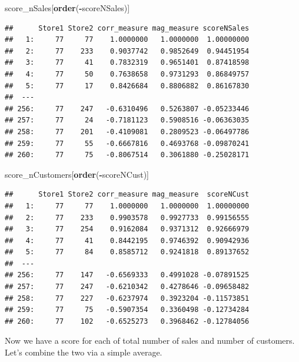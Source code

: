 \documentclass[
]{article}
\newenvironment{Shaded}{\begin{snugshade}}{\end{snugshade}}
\newcommand{\KeywordTok}[1]{\textcolor[rgb]{0.13,0.29,0.53}{\textbf{#1}}}
\newcommand{\NormalTok}[1]{#1}
\newcommand{\OperatorTok}[1]{\textcolor[rgb]{0.81,0.36,0.00}{\textbf{#1}}}
\begin{document}
\begin{Shaded}
\begin{Highlighting}[]
\NormalTok{score_nSales[}\KeywordTok{order}\NormalTok{(}\OperatorTok{-}\NormalTok{scoreNSales)]}
\end{Highlighting}
\end{Shaded}

\begin{verbatim}
##      Store1 Store2 corr_measure mag_measure scoreNSales
##   1:     77     77    1.0000000   1.0000000  1.00000000
##   2:     77    233    0.9037742   0.9852649  0.94451954
##   3:     77     41    0.7832319   0.9651401  0.87418598
##   4:     77     50    0.7638658   0.9731293  0.86849757
##   5:     77     17    0.8426684   0.8806882  0.86167830
##  ---                                                   
## 256:     77    247   -0.6310496   0.5263807 -0.05233446
## 257:     77     24   -0.7181123   0.5908516 -0.06363035
## 258:     77    201   -0.4109081   0.2809523 -0.06497786
## 259:     77     55   -0.6667816   0.4693768 -0.09870241
## 260:     77     75   -0.8067514   0.3061880 -0.25028171
\end{verbatim}

\begin{Shaded}
\begin{Highlighting}[]
\NormalTok{score_nCustomers[}\KeywordTok{order}\NormalTok{(}\OperatorTok{-}\NormalTok{scoreNCust)]}
\end{Highlighting}
\end{Shaded}

\begin{verbatim}
##      Store1 Store2 corr_measure mag_measure  scoreNCust
##   1:     77     77    1.0000000   1.0000000  1.00000000
##   2:     77    233    0.9903578   0.9927733  0.99156555
##   3:     77    254    0.9162084   0.9371312  0.92666979
##   4:     77     41    0.8442195   0.9746392  0.90942936
##   5:     77     84    0.8585712   0.9241818  0.89137652
##  ---                                                   
## 256:     77    147   -0.6569333   0.4991028 -0.07891525
## 257:     77    247   -0.6210342   0.4278646 -0.09658482
## 258:     77    227   -0.6237974   0.3923204 -0.11573851
## 259:     77     75   -0.5907354   0.3360498 -0.12734284
## 260:     77    102   -0.6525273   0.3968462 -0.12784056
\end{verbatim}

Now we have a score for each of total number of sales and number of
customers. Let's combine the two via a simple average.
\end{document}
